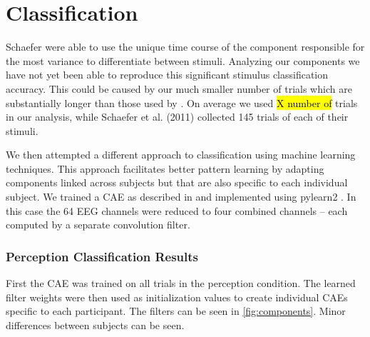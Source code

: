 \chapter*{Classification}
Schaefer \etal \cite{schaefer_name_2011} were able to use the unique time course of the component responsible for the most variance to differentiate between stimuli.
Analyzing our components we have not yet been able to reproduce this significant stimulus classification accuracy. 
This could be caused by our much smaller number of trials which are substantially longer than those used by \cite{schaefer_name_2011}. 
On average we used \hl{X number of} trials in our analysis, while Schaefer et al. (2011) collected 145 trials of each of their stimuli.

We then attempted a different approach to classification using machine learning techniques. This approach facilitates better pattern learning by adapting components linked across subjects but that are also specific to each individual subject. 
We trained a \ac{CAE} as described in \cite{masci_stacked_2011} and implemented using pylearn2 \cite{goodfellow_pylearn2_2013}.
In this case the 64 \ac{EEG} channels were reduced to four combined channels -- each computed by a separate convolution filter. 
\subsection*{Perception Classification Results}
First the \ac{CAE} was trained on all trials in the perception condition. The learned filter weights were then used as initialization values to create individual \ac{CAE}s specific to each participant.
The filters can be seen in \autoref{fig:components}. 
Minor differences between subjects can be seen. 

